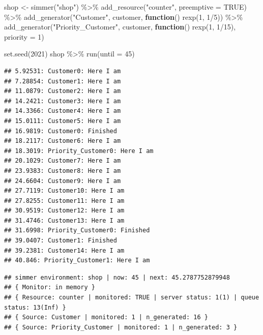 \documentclass[
]{book}
\newenvironment{Shaded}{\begin{snugshade}}{\end{snugshade}}
\newcommand{\AttributeTok}[1]{\textcolor[rgb]{0.77,0.63,0.00}{#1}}
\newcommand{\ConstantTok}[1]{\textcolor[rgb]{0.00,0.00,0.00}{#1}}
\newcommand{\ControlFlowTok}[1]{\textcolor[rgb]{0.13,0.29,0.53}{\textbf{#1}}}
\newcommand{\DecValTok}[1]{\textcolor[rgb]{0.00,0.00,0.81}{#1}}
\newcommand{\FunctionTok}[1]{\textcolor[rgb]{0.00,0.00,0.00}{#1}}
\newcommand{\NormalTok}[1]{#1}
\newcommand{\OtherTok}[1]{\textcolor[rgb]{0.56,0.35,0.01}{#1}}
\newcommand{\SpecialCharTok}[1]{\textcolor[rgb]{0.00,0.00,0.00}{#1}}
\newcommand{\StringTok}[1]{\textcolor[rgb]{0.31,0.60,0.02}{#1}}
\begin{document}
\begin{Shaded}
\begin{Highlighting}[]
\NormalTok{shop }\OtherTok{\textless{}{-}}
  \FunctionTok{simmer}\NormalTok{(}\StringTok{"shop"}\NormalTok{) }\SpecialCharTok{\%\textgreater{}\%}
  \FunctionTok{add\_resource}\NormalTok{(}\StringTok{"counter"}\NormalTok{, }\AttributeTok{preemptive =} \ConstantTok{TRUE}\NormalTok{) }\SpecialCharTok{\%\textgreater{}\%}
  \FunctionTok{add\_generator}\NormalTok{(}\StringTok{"Customer"}\NormalTok{, customer, }\ControlFlowTok{function}\NormalTok{() }\FunctionTok{rexp}\NormalTok{(}\DecValTok{1}\NormalTok{, }\DecValTok{1}\SpecialCharTok{/}\DecValTok{5}\NormalTok{)) }\SpecialCharTok{\%\textgreater{}\%}
\FunctionTok{add\_generator}\NormalTok{(}\StringTok{"Priority\_Customer"}\NormalTok{, customer, }\ControlFlowTok{function}\NormalTok{() }\FunctionTok{rexp}\NormalTok{(}\DecValTok{1}\NormalTok{, }\DecValTok{1}\SpecialCharTok{/}\DecValTok{15}\NormalTok{), }\AttributeTok{priority =} \DecValTok{1}\NormalTok{)}

\FunctionTok{set.seed}\NormalTok{(}\DecValTok{2021}\NormalTok{)}
\NormalTok{shop }\SpecialCharTok{\%\textgreater{}\%} \FunctionTok{run}\NormalTok{(}\AttributeTok{until =} \DecValTok{45}\NormalTok{)}
\end{Highlighting}
\end{Shaded}

\begin{verbatim}
## 5.92531: Customer0: Here I am
## 7.28854: Customer1: Here I am
## 11.0879: Customer2: Here I am
## 14.2421: Customer3: Here I am
## 14.3366: Customer4: Here I am
## 15.0111: Customer5: Here I am
## 16.9819: Customer0: Finished
## 18.2117: Customer6: Here I am
## 18.3019: Priority_Customer0: Here I am
## 20.1029: Customer7: Here I am
## 23.9383: Customer8: Here I am
## 24.6604: Customer9: Here I am
## 27.7119: Customer10: Here I am
## 27.8255: Customer11: Here I am
## 30.9519: Customer12: Here I am
## 31.4746: Customer13: Here I am
## 31.6998: Priority_Customer0: Finished
## 39.0407: Customer1: Finished
## 39.2381: Customer14: Here I am
## 40.846: Priority_Customer1: Here I am
\end{verbatim}

\begin{verbatim}
## simmer environment: shop | now: 45 | next: 45.2787752879948
## { Monitor: in memory }
## { Resource: counter | monitored: TRUE | server status: 1(1) | queue status: 13(Inf) }
## { Source: Customer | monitored: 1 | n_generated: 16 }
## { Source: Priority_Customer | monitored: 1 | n_generated: 3 }
\end{verbatim}
\end{document}

